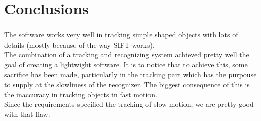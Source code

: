 \documentclass{beamer}
\begin{document}
	\section{Conclusions}

	\begin{frame}
		\frametitle{\insertsection}
		The software works very well in tracking simple shaped objects with
		lots of details (mostly because of the way SIFT works).\\
		The combination of a tracking and recognizing system achieved pretty
		well the goal of creating a lightwight software.
		It is to notice that to achieve this, some sacrifice has been made,
		particularly in the tracking part which has the purpouse to supply at
		the slowliness of the recognizer. The biggest consequence of this is
		the inaccuracy in tracking objects in fast motion.\\
		Since the requirements specified the tracking of slow motion, we
		are pretty good with that flaw.
	\end{frame}
\end{document}
